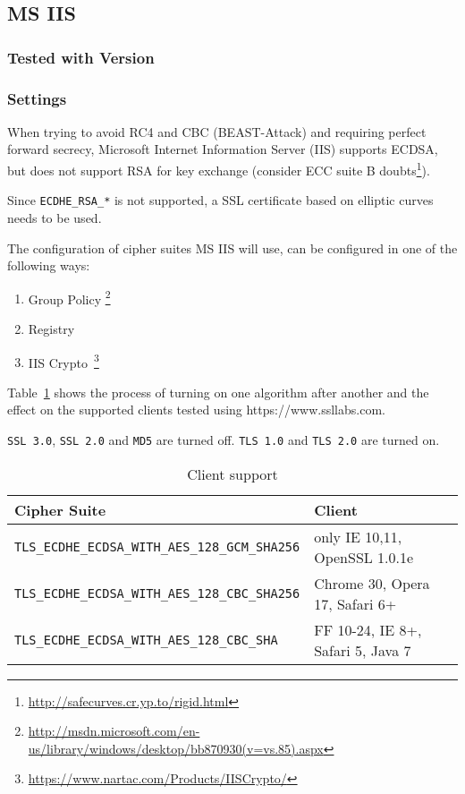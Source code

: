 \subsection{MS IIS}
\label{sec:ms-iis}




\subsubsection{Tested with Version} 

\subsubsection{Settings}


When trying to avoid RC4 and CBC (BEAST-Attack) and requiring perfect
forward secrecy, Microsoft Internet Information Server (IIS) supports
ECDSA, but does not support RSA for key exchange (consider ECC suite
B doubts\footnote{\url{http://safecurves.cr.yp.to/rigid.html}}).

Since \verb|ECDHE_RSA_*| is not supported, a SSL certificate based on
elliptic curves needs to be used.

The configuration of cipher suites MS IIS will use, can be configured in one
of the following ways:
\begin{enumerate}
\item Group Policy \footnote{\url{http://msdn.microsoft.com/en-us/library/windows/desktop/bb870930(v=vs.85).aspx}}
\item Registry
\item IIS Crypto~\footnote{\url{https://www.nartac.com/Products/IISCrypto/}}
\end{enumerate}


Table~\ref{tab:MS_IIS_Client_Support} shows the process of turning on
one algorithm after another and the effect on the supported clients
tested using https://www.ssllabs.com.

\verb|SSL 3.0|, \verb|SSL 2.0| and \verb|MD5| are turned off.
\verb|TLS 1.0| and \verb|TLS 2.0| are turned on.

\begin{table}[h]
  \centering
  \small
  \begin{tabular}{ll}
    \toprule
    Cipher Suite & Client \\
    \midrule
    \verb|TLS_ECDHE_ECDSA_WITH_AES_128_GCM_SHA256| & only IE 10,11, OpenSSL 1.0.1e \\
    \verb|TLS_ECDHE_ECDSA_WITH_AES_128_CBC_SHA256| & Chrome 30, Opera 17, Safari 6+ \\
    \verb|TLS_ECDHE_ECDSA_WITH_AES_128_CBC_SHA| & FF 10-24, IE 8+, Safari 5, Java 7\\
    \bottomrule 
 \end{tabular}
  \caption{Client support}
  \label{tab:MS_IIS_Client_Support}
\end{table}

